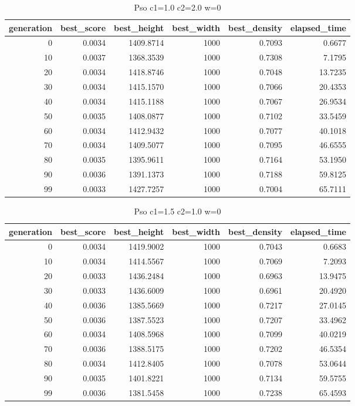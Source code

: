 \begin{table}[htbp]
    \centering
    \caption{Pso c1=1.0 c2=2.0 w=0}
    \label{tab:pso_c1_1_0_c2_2_0_w_0}
    \begin{tabular}{rrrrrr}
    \toprule
    generation & best_score & best_height & best_width & best_density & elapsed_time \\
    \midrule
    0 & 0.0034 & 1409.8714 & 1000 & 0.7093 & 0.6677 \\
    10 & 0.0037 & 1368.3539 & 1000 & 0.7308 & 7.1795 \\
    20 & 0.0034 & 1418.8746 & 1000 & 0.7048 & 13.7235 \\
    30 & 0.0034 & 1415.1570 & 1000 & 0.7066 & 20.4353 \\
    40 & 0.0034 & 1415.1188 & 1000 & 0.7067 & 26.9534 \\
    50 & 0.0035 & 1408.0877 & 1000 & 0.7102 & 33.5459 \\
    60 & 0.0034 & 1412.9432 & 1000 & 0.7077 & 40.1018 \\
    70 & 0.0034 & 1409.5077 & 1000 & 0.7095 & 46.6555 \\
    80 & 0.0035 & 1395.9611 & 1000 & 0.7164 & 53.1950 \\
    90 & 0.0036 & 1391.1373 & 1000 & 0.7188 & 59.8125 \\
    99 & 0.0033 & 1427.7257 & 1000 & 0.7004 & 65.7111 \\
    \bottomrule
    \end{tabular}
\end{table}


\begin{table}[htbp]
    \centering
    \caption{Pso c1=1.5 c2=1.0 w=0}
    \label{tab:pso_c1_1_5_c2_1_0_w_0}
    \begin{tabular}{rrrrrr}
    \toprule
    generation & best_score & best_height & best_width & best_density & elapsed_time \\
    \midrule
    0 & 0.0034 & 1419.9002 & 1000 & 0.7043 & 0.6683 \\
    10 & 0.0034 & 1414.5567 & 1000 & 0.7069 & 7.2093 \\
    20 & 0.0033 & 1436.2484 & 1000 & 0.6963 & 13.9475 \\
    30 & 0.0033 & 1436.6009 & 1000 & 0.6961 & 20.4920 \\
    40 & 0.0036 & 1385.5669 & 1000 & 0.7217 & 27.0145 \\
    50 & 0.0036 & 1387.5523 & 1000 & 0.7207 & 33.4962 \\
    60 & 0.0034 & 1408.5968 & 1000 & 0.7099 & 40.0219 \\
    70 & 0.0036 & 1388.5175 & 1000 & 0.7202 & 46.5354 \\
    80 & 0.0034 & 1412.8405 & 1000 & 0.7078 & 53.0644 \\
    90 & 0.0035 & 1401.8221 & 1000 & 0.7134 & 59.5755 \\
    99 & 0.0036 & 1381.5458 & 1000 & 0.7238 & 65.4593 \\
    \bottomrule
    \end{tabular}
\end{table}


